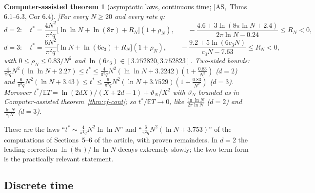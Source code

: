 \documentclass[10pt,a4paper]{article}
\theoremstyle{plain}
\newtheorem{catheorem}[theorem]{Computer-assisted theorem}
\theoremstyle{definition}
\newcommand{\src}[2]{[\textsf{#1},~#2]}           %
\newcommand{\ASY}{\textsf{AS}}
\newcommand{\E}{\mathbb{E}}
\begin{document}
\begin{catheorem}[asymptotic laws, continuous time; \src{\ASY}{Thms 6.1--6.3, Cor 6.4}]\label{thm:laws}
For every $N\ge20$ and every rate $q$:
\[
d=2:\quad t^*=\frac{4N^2}{\pi^2q}\bigl[\ln\ln N+\ln(8\pi)+R_N\bigr](1+\rho_N),\qquad -\frac{4.6+3\ln(8\pi\ln N+2.4)}{2\pi\ln N-0.24}\le R_N<0,
\]
\[
d=3:\quad t^*=\frac{6N^2}{\pi^2q}\bigl[\ln N+\ln(6c_3)+R_N\bigr](1+\rho_N),\qquad -\frac{9.2+5\ln(6c_3N)}{c_3N-7.63}\le R_N<0,
\]
with $0\le\rho_N\le0.83/N^2$ and $\ln(6c_3)\in[3.752820,3.752823]$. Two-sided bounds: $\frac4{\pi^2q}N^2(\ln\ln N+2.27)\le t^*\le\frac4{\pi^2q}N^2(\ln\ln N+3.2242)(1+\frac{0.83}{N^2})$ ($d=2$) and $\frac6{\pi^2q}N^2(\ln N+3.43)\le t^*\le\frac6{\pi^2q}N^2(\ln N+3.7529)(1+\frac{0.83}{N^2})$ ($d=3$). Moreover $t^*/\E T=\ln(2dX)/(X+2d-1)+\vartheta_N/X^2$ with $\vartheta_N$ bounded as in Computer-assisted theorem~\ref{thm:cf-cont}; so $t^*/\E T\to0$, like $\frac{\ln\ln N}{2\pi\ln N}$ ($d=2$) and $\frac{\ln N}{c_3N}$ ($d=3$).
\end{catheorem}
These are the laws ``$t^*\sim\frac4{\pi^2q}N^2\ln\ln N$'' and ``$\frac6{\pi^2q}N^2(\ln N+3.753)$'' of the computations of Sections~5--6 of the article, with proven remainders. In $d=2$ the leading correction $\ln(8\pi)/\ln\ln N$ decays extremely slowly; the two-term form is the practically relevant statement.

\subsection{Discrete time}
\end{document}
